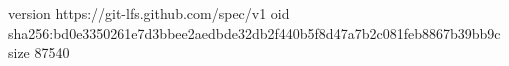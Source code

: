 version https://git-lfs.github.com/spec/v1
oid sha256:bd0e3350261e7d3bbee2aedbde32db2f440b5f8d47a7b2c081feb8867b39bb9c
size 87540
